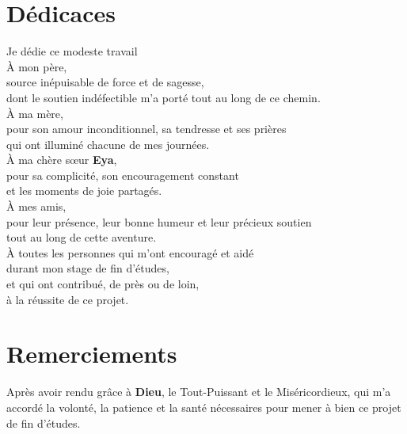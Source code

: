 \documentclass[12pt,a4paper,twoside]{report}
\begin{document}
\chapter*{Dédicaces}

\vspace{3cm}

\begin{center}
\itshape\large

Je dédie ce modeste travail\\[0.6cm]

À mon père,\\
source inépuisable de force et de sagesse,\\
dont le soutien indéfectible m'a porté tout au long de ce chemin.\\[0.6cm]

À ma mère,\\
pour son amour inconditionnel, sa tendresse et ses prières\\
qui ont illuminé chacune de mes journées.\\[0.6cm]

À ma chère sœur \textbf{Eya},\\
pour sa complicité, son encouragement constant\\
et les moments de joie partagés.\\[0.6cm]

À mes amis,\\
pour leur présence, leur bonne humeur et leur précieux soutien\\
tout au long de cette aventure.\\[0.6cm]

À toutes les personnes qui m'ont encouragé et aidé\\
durant mon stage de fin d'études,\\
et qui ont contribué, de près ou de loin,\\
à la réussite de ce projet.

\end{center}

\newpage

\chapter*{Remerciements}

Après avoir rendu grâce à \textbf{Dieu}, le Tout-Puissant et le Miséricordieux, qui m'a
accordé la volonté, la patience et la santé nécessaires pour mener à bien ce projet de
fin d'études.
\end{document}
